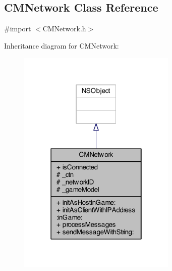 \subsection{C\-M\-Network Class Reference}
\label{interface_c_m_network}


{\ttfamily \#import $<$C\-M\-Network.\-h$>$}



Inheritance diagram for C\-M\-Network\-:
\nopagebreak
\begin{figure}[H]
\begin{center}
\leavevmode
\includegraphics[width=214pt]{interface_c_m_network__inherit__graph}
\end{center}
\end{figure}


